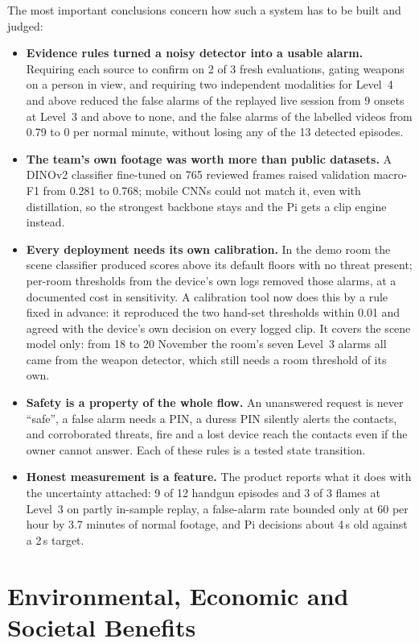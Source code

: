 The most important conclusions concern how such a system has to be built and judged:
\begin{itemize}
\item \textbf{Evidence rules turned a noisy detector into a usable alarm.} Requiring each source to confirm on 2 of 3 fresh evaluations, gating weapons on a person in view, and requiring two independent modalities for Level~4 and above reduced the false alarms of the replayed live session from 9 onsets at Level~3 and above to none, and the false alarms of the labelled videos from 0.79 to 0 per normal minute, without losing any of the 13 detected episodes.
\item \textbf{The team's own footage was worth more than public datasets.} A DINOv2 classifier fine-tuned on 765 reviewed frames raised validation macro-F1 from 0.281 to 0.768; mobile CNNs could not match it, even with distillation, so the strongest backbone stays and the Pi gets a clip engine instead.
\item \textbf{Every deployment needs its own calibration.} In the demo room the scene classifier produced scores above its default floors with no threat present; per-room thresholds from the device's own logs removed those alarms, at a documented cost in sensitivity. A calibration tool now does this by a rule fixed in advance: it reproduced the two hand-set thresholds within 0.01 and agreed with the device's own decision on every logged clip. It covers the scene model only: from 18 to 20 November the room's seven Level~3 alarms all came from the weapon detector, which still needs a room threshold of its own.
\item \textbf{Safety is a property of the whole flow.} An unanswered request is never ``safe'', a false alarm needs a PIN, a duress PIN silently alerts the contacts, and corroborated threats, fire and a lost device reach the contacts even if the owner cannot answer. Each of these rules is a tested state transition.
\item \textbf{Honest measurement is a feature.} The product reports what it does with the uncertainty attached: 9 of 12 handgun episodes and 3 of 3 flames at Level~3 on partly in-sample replay, a false-alarm rate bounded only at 60 per hour by 3.7 minutes of normal footage, and Pi decisions about 4\,s old against a 2\,s target.
\end{itemize}

\section{Environmental, Economic and Societal Benefits}
